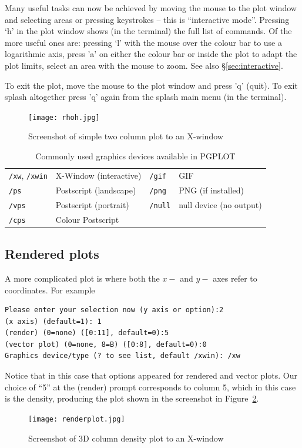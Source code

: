 \documentclass[a4paper,11pt]{article}
\begin{document}
 Many useful tasks can now be achieved by moving the mouse to the plot window and selecting areas or pressing keystrokes -- this is ``interactive mode''. Pressing `h' in the plot window shows (in the terminal) the full list of commands. Of the more useful ones are: pressing `l' with the mouse over the colour bar to use a logarithmic axis, press 'a' on either the colour bar or inside the plot to adapt the plot limits, select an area with the mouse to zoom. See also \S\ref{sec:interactive}.

To exit the plot, move the mouse to the plot window and press 'q' (quit). To exit splash altogether press 'q' again from the splash main menu (in the terminal). 
\begin{figure}[ht]
\begin{center}
\texttt{[image: rhoh.jpg]}
\caption{Screenshot of simple two column plot to an X-window}
\label{fig:rhoh}
\end{center}
\end{figure}

\begin{table}[h]
\centering
\begin{tabular}{|l|l|l|l|}
\hline
\verb+/xw+, \verb+/xwin+ & X-Window (interactive) & \verb+/gif+ & GIF \\
\verb+/ps+ & Postscript (landscape) & \verb+/png+ & PNG (if installed) \\
\verb+/vps+ & Postscript (portrait) & \verb+/null+ & null device (no output) \\
\verb+/cps+ & Colour Postscript & & \\
\hline
\end{tabular}
\caption{Commonly used graphics devices available in PGPLOT}
\label{tab:devices}
\end{table}

\subsection{Rendered plots}
\label{sec:renderplot}
A more complicated plot is where both the $x-$ and $y-$ axes refer to coordinates. For example
\begin{verbatim}
Please enter your selection now (y axis or option):2
(x axis) (default=1): 1
(render) (0=none) ([0:11], default=0):5
(vector plot) (0=none, 8=B) ([0:8], default=0):0
Graphics device/type (? to see list, default /xwin): /xw
\end{verbatim}
Notice that in this case that options appeared for rendered and vector plots. Our choice of ``5'' at the (render) prompt corresponds to column 5, which in this case is the density, producing the plot shown in the screenshot in Figure~\ref{fig:renderplot}.
\begin{figure}[h]
\begin{center}
\texttt{[image: renderplot.jpg]}
\caption{Screenshot of 3D column density plot to an X-window}
\label{fig:renderplot}
\end{center}
\end{figure}
\end{document}
